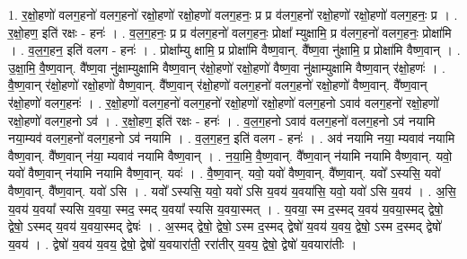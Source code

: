 \documentclass[17pt]{extarticle}
\begin{document}
1. र॒क्षो॒हणो॑ वलग॒हनो॑ वलग॒हनो॑ रक्षो॒हणो॑ रक्षो॒हणो॑ वलग॒हनः॒ प्र प्र व॑लग॒हनो॑ रक्षो॒हणो॑ रक्षो॒हणो॑ वलग॒हनः॒ प्र । . र॒क्षो॒हण॒ इति॑ रक्षः - हनः॑ । . व॒ल॒ग॒हनः॒ प्र प्र व॑लग॒हनो॑ वलग॒हनः॒ प्रोक्षा᳚ म्युक्षामि॒ प्र व॑लग॒हनो॑ वलग॒हनः॒ प्रोक्षा॑मि । . व॒ल॒ग॒हन॒ इति॑ वलग - हनः॑ । . प्रोक्षा᳚म्यु क्षामि॒ प्र प्रोक्षा॑मि वैष्ण॒वान्. वै᳚ष्ण॒वा नु॑क्षामि॒ प्र प्रोक्षा॑मि वैष्ण॒वान् । . उ॒क्षा॒मि॒ वै॒ष्ण॒वान्. वै᳚ष्ण॒वा नु॑क्षाम्युक्षामि वैष्ण॒वान् र॑क्षो॒हणो॑ रक्षो॒हणो॑ वैष्ण॒वा नु॑क्षाम्युक्षामि वैष्ण॒वान् र॑क्षो॒हणः॑ । . वै॒ष्ण॒वान् र॑क्षो॒हणो॑ रक्षो॒हणो॑ वैष्ण॒वान्. वै᳚ष्ण॒वान् र॑क्षो॒हणो॑ वलग॒हनो॑ वलग॒हनो॑ रक्षो॒हणो॑ वैष्ण॒वान्. वै᳚ष्ण॒वान् र॑क्षो॒हणो॑ वलग॒हनः॑ । . र॒क्षो॒हणो॑ वलग॒हनो॑ वलग॒हनो॑ रक्षो॒हणो॑ रक्षो॒हणो॑ वलग॒हनो ऽवाव॑ वलग॒हनो॑ रक्षो॒हणो॑ रक्षो॒हणो॑ वलग॒हनो ऽव॑ । . र॒क्षो॒हण॒ इति॑ रक्षः - हनः॑ । . व॒ल॒ग॒हनो ऽवाव॑ वलग॒हनो॑ वलग॒हनो ऽव॑ नयामि नया॒म्यव॑ वलग॒हनो॑ वलग॒हनो ऽव॑ नयामि । . व॒ल॒ग॒हन॒ इति॑ वलग - हनः॑ । . अव॑ नयामि नया॒ म्यवाव॑ नयामि वैष्ण॒वान्. वै᳚ष्ण॒वान् न॑या॒ म्यवाव॑ नयामि वैष्ण॒वान् । . न॒या॒मि॒ वै॒ष्ण॒वान्. वै᳚ष्ण॒वान् न॑यामि नयामि वैष्ण॒वान्. यवो॒ यवो॑ वैष्ण॒वान् न॑यामि नयामि वैष्ण॒वान्. यवः॑ । . वै॒ष्ण॒वान्. यवो॒ यवो॑ वैष्ण॒वान्. वै᳚ष्ण॒वान्. यवो᳚ ऽस्यसि॒ यवो॑ वैष्ण॒वान्. वै᳚ष्ण॒वान्. यवो॑ ऽसि । . यवो᳚ ऽस्यसि॒ यवो॒ यवो॑ ऽसि य॒वय॑ य॒वया॑सि॒ यवो॒ यवो॑ ऽसि य॒वय॑ । . अ॒सि॒ य॒वय॑ य॒वया᳚ स्यसि य॒वया॒ स्मद॒ स्मद् य॒वया᳚ स्यसि य॒वया॒स्मत् । . य॒वया॒ स्म द॒स्मद् य॒वय॑ य॒वया॒स्मद् द्वेषो॒ द्वेषो॒ ऽस्मद् य॒वय॑ य॒वया॒स्मद् द्वेषः॑ । . अ॒स्मद् द्वेषो॒ द्वेषो॒ ऽस्म द॒स्मद् द्वेषो॑ य॒वय॑ य॒वय॒ द्वेषो॒ ऽस्म द॒स्मद् द्वेषो॑ य॒वय॑ । . द्वेषो॑ य॒वय॑ य॒वय॒ द्वेषो॒ द्वेषो॑ य॒वयारा॑ती॒ ररा॑तीर् य॒वय॒ द्वेषो॒ द्वेषो॑ य॒वयारा॑तीः । \newline
\end{document}
